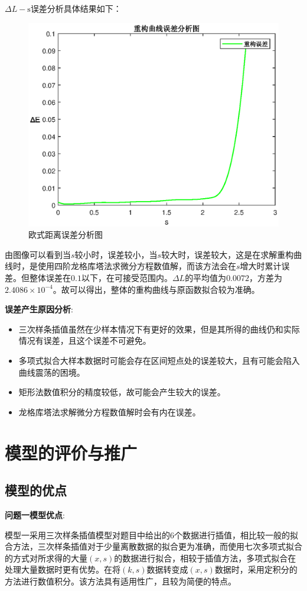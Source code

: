 \documentclass[withoutpreface,bwprint]{cumcmthesis}
\begin{document}
$\Delta L-\mathrm{s}$误差分析具体结果如下：
\begin{figure}[!h]
\centering
\includegraphics[width=.6\textwidth]{Q3误差.eps}
\caption{欧式距离误差分析图}
\end{figure}

\vspace{4cm}

由图像可以看到当$s$较小时，误差较小，当$s$较大时，误差较大，这是在求解重构曲线时，是使用四阶龙格库塔法求微分方程数值解，而该方法会在$s$增大时累计误差。但整体误差在$0.1$以下，在可接受范围内。$\Delta L$的平均值为$0.0072$，方差为$2.4086 \times 10^{-4}$。故可以得出，整体的重构曲线与原函数拟合较为准确。

\textbf{误差产生原因分析}:
\begin{itemize}
\item 三次样条插值虽然在少样本情况下有更好的效果，但是其所得的曲线仍和实际情况有误差，且这个误差不可避免。
\item 多项式拟合大样本数据时可能会存在区间短点处的误差较大，且有可能会陷入曲线震荡的困境。
\item 矩形法数值积分的精度较低，故可能会产生较大的误差。
\item 龙格库塔法求解微分方程数值解时会有内在误差。
\end{itemize}


\section{模型的评价与推广}
\subsection{模型的优点}
\textbf{问题一模型优点}:

模型一采用三次样条插值模型对题目中给出的$6$个数据进行插值，相比较一般的拟合方法，三次样条插值对于少量离散数据的拟合更为准确，而使用七次多项式拟合的方式对所求得的大量$(x,s)$的数据进行拟合，相较于插值方法，多项式拟合在处理大量数据时更有优势。在将$(k,s)$数据转变成$(x,s)$数据时，采用定积分的方法进行数值积分。该方法具有适用性广，且较为简便的特点。
\end{document}
